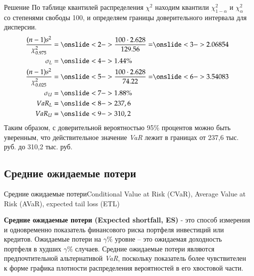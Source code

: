 \documentclass[_fin_decisions_lectures.tex]{subfiles}
\begin{document}
\begin{frame}[shrink=15]
\begin{exampleblock}{Решение}
По таблице квантилей распределения $\chi^2$ находим квантили $\chi_{1-\alpha}^2$ и $\chi_{\alpha}^2$ со степенями свободы 100, и определяем границы доверительного интервала для дисперсии.
\begin{align*}
\frac{(n-1)s^2}{\chi_{0.975}^2} &=\onslide<2->{\frac{100 \cdot 2.628}{129.56}=}\onslide<3->{2.06854}\\
\sigma_L&=\onslide<4->{1.44\%}\\
\frac{(n-1)s^2}{\chi_{0.025}^2}&=\onslide<5->{\frac{100 \cdot 2.628}{74.22}=}\onslide<6->{3.54083}\\
\sigma_U&=\onslide<7->{1.88\%}\\
VaR_L&=\onslide<8->{237,6}\\
VaR_U&=\onslide<9->{310,2}
\end{align*}
Таким образом, с доверительной вероятностью 95\% процентов можно быть уверенным, что действительное значение \textit{VaR} лежит в границах от 237,6 тыс. руб. до 310,2 тыс. руб.

\end{exampleblock}
\end{frame}
\subsection{Средние ожидаемые потери}
\begin{frame}{Средние ожидаемые потери}{Conditional Value at Risk (CVaR), Average Value at Risk (AVaR), expected tail loss (ETL)}
\begin{block}{\textbf{Средние ожидаемые потери (Expected shortfall, ES)}}
- это способ измерения и одновременно показатель финансового риска портфеля инвестиций или кредитов. Ожидаемые потери на $\gamma\%$ уровне – это ожидаемая доходность портфеля в худших $\gamma\%$ случаев. Средние ожидаемые потери являются предпочтительной альтернативой \textit{VaR}, поскольку показатель более чувствителен к форме графика плотности распределения вероятностей в его хвостовой части.
\end{block}
\end{frame}
\end{document}
